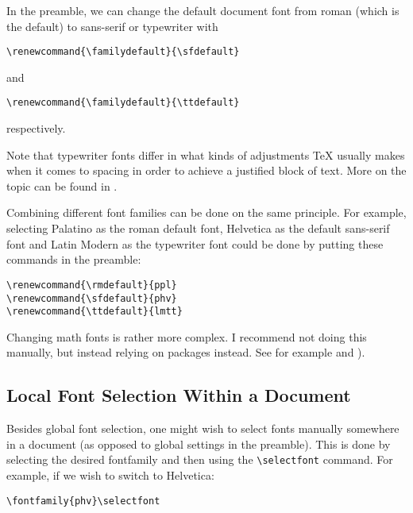 \documentclass[a4paper,oneside,11pt]{article}
\newcommand\comm[1]{\texttt{\textbackslash#1}}
\begin{document}

In the preamble, we can change the  default document font from roman (which is
the default) to sans-serif or typewriter with

\begin{verbatim}
\renewcommand{\familydefault}{\sfdefault}
\end{verbatim}
and
\begin{verbatim}
\renewcommand{\familydefault}{\ttdefault}
\end{verbatim}
respectively.

Note that typewriter fonts differ in  what kinds of adjustments \TeX{} usually
makes  when it  comes to  spacing in  order to  achieve a  justified block  of
text. More on the topic can be found in \cite{texblog:typewriter}.

Combining different  font families  can be  done on  the same  principle.  For
example,  selecting Palatino  as  the  roman default  font,  Helvetica as  the
default sans-serif font and Latin Modern  as the typewriter font could be done
by putting these commands in the preamble:

\begin{verbatim}
\renewcommand{\rmdefault}{ppl}
\renewcommand{\sfdefault}{phv}
\renewcommand{\ttdefault}{lmtt}
\end{verbatim}

Changing  math  fonts is  rather  more  complex. I  recommend not  doing  this
manually,   but  instead   relying  on   packages  instead. See   for  example
\cite{stackexch:math-fonts} and \cite{practex:fonts}).


\subsection{Local Font Selection Within a Document}
\label{subsec:fontsel:local}

Besides  global  font selection,  one  might  wish  to select  fonts  manually
somewhere in a document (as opposed  to global settings in the preamble). This
is   done  by   selecting  the   desired   fontfamily  and   then  using   the
\comm{selectfont} command. For example, if we wish to switch to Helvetica:

\begin{verbatim}
\fontfamily{phv}\selectfont
\end{verbatim}
\end{document}
